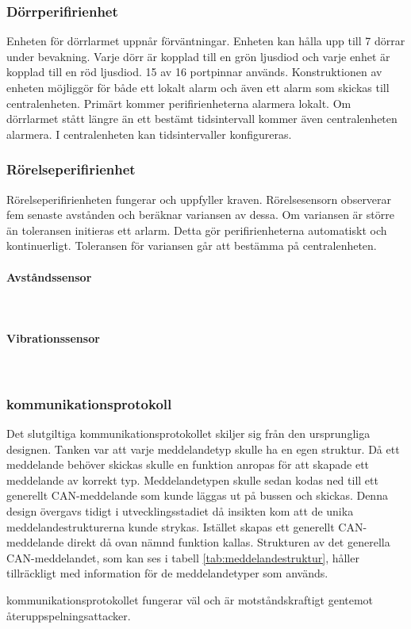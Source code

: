 \documentclass[a4paper]{article}
\newcommand{\todo}[1]{\marginpar{TODO: #1}\vspace{1cm}}
\newcommand{\subsubsubsection}[1]{\paragraph{#1}\mbox{}\\}
\begin{document}
\subsubsection{Dörrperifirienhet}
\todo{Motivera varför 7 dörrar används}
Enheten för dörrlarmet uppnår förväntningar. Enheten kan hålla upp till 7 dörrar under bevakning. Varje dörr är kopplad till en grön ljusdiod och varje enhet är kopplad till en röd ljusdiod. 15 av 16 portpinnar används. Konstruktionen av enheten möjliggör för både ett lokalt alarm och även ett alarm som skickas till centralenheten. Primärt kommer perifirienheterna alarmera lokalt. Om dörrlarmet stått längre än ett bestämt tidsintervall kommer även centralenheten alarmera. I centralenheten kan tidsintervaller konfigureras.

\subsubsection{Rörelseperifirienhet}
Rörelseperifirienheten fungerar och uppfyller kraven. Rörelsesensorn observerar fem senaste avstånden och beräknar variansen av dessa. Om variansen är större än toleransen initieras ett arlarm. Detta gör perifirienheterna automatiskt och kontinuerligt. Toleransen för variansen går att bestämma på centralenheten.

\subsubsubsection{Avståndssensor}
\todo{}

\subsubsubsection{Vibrationssensor}

\subsubsection{kommunikationsprotokoll}
Det slutgiltiga kommunikationsprotokollet skiljer sig från den ursprungliga designen.
Tanken var att varje meddelandetyp skulle ha en egen struktur.
Då ett meddelande behöver skickas skulle en funktion anropas för att skapade ett meddelande av korrekt typ.
Meddelandetypen skulle sedan kodas ned till ett generellt CAN-meddelande som kunde läggas ut på bussen och skickas.
Denna design övergavs tidigt i utvecklingsstadiet då insikten kom att de unika meddelandestrukturerna kunde strykas.
Istället skapas ett generellt CAN-meddelande direkt då ovan nämnd funktion kallas.
Strukturen av det generella CAN-meddelandet, som kan ses i tabell \ref{tab:meddelandestruktur}, håller tillräckligt med information för de meddelandetyper som används.

kommunikationsprotokollet fungerar väl och är motståndskraftigt gentemot återuppspelningsattacker.
\end{document}
